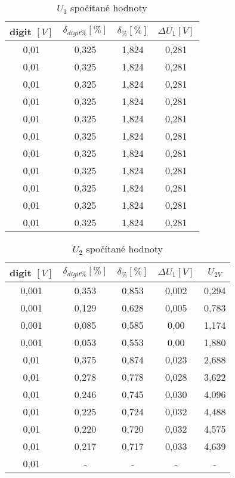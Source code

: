   \begin{table}[H]
    \centering
    \begin{tabular}[h]{|c|c|c|c|}
      \hline
      digit $[V]$ & $\delta _{digit\%} [\%]$ & $\delta _\% [\%]$ & $\Delta U_1 [V]$ \\
      \hline
      0,01 & 0,325 & 1,824 & 0,281 \\
      0,01 & 0,325 & 1,824 & 0,281 \\
      0,01 & 0,325 & 1,824 & 0,281 \\
      0,01 & 0,325 & 1,824 & 0,281 \\
      0,01 & 0,325 & 1,824 & 0,281 \\
      0,01 & 0,325 & 1,824 & 0,281 \\
      0,01 & 0,325 & 1,824 & 0,281 \\
      0,01 & 0,325 & 1,824 & 0,281 \\
      0,01 & 0,325 & 1,824 & 0,281 \\
      0,01 & 0,325 & 1,824 & 0,281 \\
      0,01 & 0,325 & 1,824 & 0,281 \\
      \hline
    \end{tabular}
    \caption{$U_1$ spočítané hodnoty}
  \end{table}
  \begin{table}[H]
    \centering
    \begin{tabular}[h]{|c|c|c|c|c|}
      \hline
      digit $[V]$ & $\delta _{digit\%} [\%]$ & $\delta _\% [\%]$ & $\Delta U_1 [V]$ & $U_{2V}$\\
      \hline
      0,001 & 0,353 & 0,853 & 0,002 & 0,294\\
      0,001 & 0,129 & 0,628 & 0,005 & 0,783\\
      0,001 & 0,085 & 0,585 & 0,00 & 1,174\\
      0,001 & 0,053 & 0,553 & 0,00 & 1,880\\
      0,01 & 0,375 & 0,874 & 0,023 & 2,688\\
      0,01 & 0,278 & 0,778 & 0,028 & 3,622\\
      0,01 & 0,246 & 0,745 & 0,030 & 4,096\\
      0,01 & 0,225 & 0,724 & 0,032 & 4,488\\
      0,01 & 0,220 & 0,720 & 0,032 & 4,575\\
      0,01 & 0,217 & 0,717 & 0,033 & 4,639\\
      0,01 & - & - & - & - \\
      \hline
    \end{tabular}
    \caption{$U_2$ spočítané hodnoty}
  \end{table}
